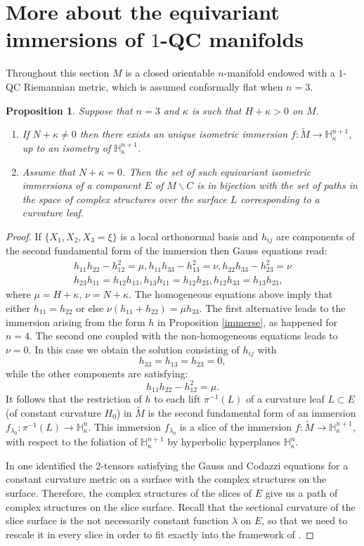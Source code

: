 \documentclass[10pt]{amsart}
\let\moins\smallsetminus
\newtheorem{proposition}[theorem]{Proposition}
\theoremstyle{definition}
\theoremstyle{remark}
\numberwithin{equation}{section}
\begin{document}
\section{More about the equivariant immersions of \texorpdfstring{$1$}{1}-QC manifolds}\label{sec:5}
Throughout this section $M$ is a closed orientable $n$-manifold endowed with a $1$-QC Riemannian metric, which is assumed
conformally flat when $n=3$.
\begin{proposition}\label{immerse3}
Suppose that $n=3$ and $\kappa$ is such that $H+\kappa >0$ on $M$.
\begin{enumerate}
\item If $N+\kappa\neq 0$ then there exists an unique isometric immersion
$f:\widetilde{M}\to \mathbb H_{\kappa}^{n+1}$, up
to an isometry of $\mathbb H_{\kappa}^{n+1}$.
\item Assume that $N+\kappa=0$. Then the set of such
equivariant isometric immersions of a component $E$ of $M\moins C$
is in bijection with the set of paths in the space of complex structures
over the surface $L$ corresponding to a curvature leaf.
\end{enumerate}
\end{proposition}
\begin{proof}
If $\{X_1,X_2,X_3=\xi\}$ is a local orthonormal basis and $h_{ij}$ are components of the second fundamental form of the immersion then Gauss equations read:
\begin{gather*}
h_{11}h_{22}-h_{12}^2=\mu,
h_{11}h_{33}-h_{13}^2=\nu, h_{22}h_{33}-h_{23}^2=\nu\\
h_{23}h_{11}=h_{12}h_{13}, h_{13}h_{11}=h_{12}h_{23},
h_{12}h_{33}=h_{13}h_{23},
\end{gather*}
where $\mu=H+\kappa$, $\nu=N+\kappa$.
The homogeneous equations above imply that
either $h_{11}=h_{22}$ or else $\nu(h_{11}+h_{22})=\mu h_{33}$.
The first alternative leads to the immersion arising from the
form $h$ in Proposition \ref{immerse}, as happened for $n=4$.
The second one coupled with the non-homogeneous equations
leads to $\nu=0$. In this case we obtain the solution consisting of
$h_{ij}$ with
\[ h_{33}=h_{13}=h_{23}=0,\]
while the other components are satisfying:
\[h_{11}h_{22}-h_{12}^2=\mu.\]
It follows that the restriction of $h$ to each lift $\pi^{-1}(L)$
of a curvature leaf $L\subset E$ (of constant curvature $H_0$)
in $\widetilde{M}$ is the second fundamental form of
an immersion $f_{\lambda_0}:\pi^{-1}(L)\to \mathbb H_{\kappa}^n$.
This immersion $f_{\lambda_0}$ is a slice of the
immersion $f:\widetilde{M}\to \mathbb H_{\kappa}^{n+1}$,
with respect to the foliation of $\mathbb H_{\kappa}^{n+1}$ by
hyperbolic hyperplanes $\mathbb H_{\kappa}^n$.

In \cite[Prop.\,2.5]{Lab} one identified
the 2-tensors satisfying the Gauss and Codazzi equations for
a constant curvature metric on a surface with the complex structures on the surface. Therefore, the complex structures of the slices of $E$ give
us a path of complex structures on the slice surface.
Recall that the sectional curvature of the slice surface
is the not necessarily constant function $\lambda$ on $E$,
so that we need to rescale it in every slice in order to
fit exactly into the framework of \cite[Prop.\,2.5]{Lab}.
\end{proof}
\end{document}
